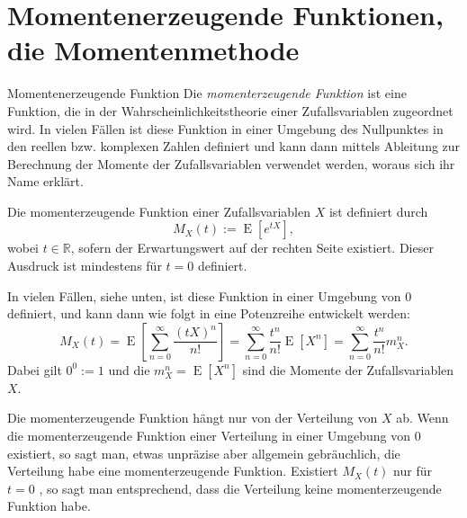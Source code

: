 \section{Momentenerzeugende Funktionen, die Momentenmethode}

\begin{defi}{Momentenerzeugende Funktion}
    Die \emph{momenterzeugende Funktion} ist eine Funktion, die in der Wahrscheinlichkeitstheorie einer Zufallsvariablen zugeordnet wird. In vielen Fällen ist diese Funktion in einer Umgebung des Nullpunktes in den reellen bzw. komplexen Zahlen definiert und kann dann mittels Ableitung zur Berechnung der Momente der Zufallsvariablen verwendet werden, woraus sich ihr Name erklärt.

    Die momenterzeugende Funktion einer Zufallsvariablen $X$ ist definiert durch
    \[
        M_X(t) := \operatorname{E} \left[ e^{tX} \right],
    \]
    wobei $t \in \mathbb{R}$, sofern der Erwartungswert auf der rechten Seite existiert.
    Dieser Ausdruck ist mindestens für $t = 0$ definiert.

    In vielen Fällen, siehe unten, ist diese Funktion in einer Umgebung von $0$ definiert, und kann dann wie folgt in eine Potenzreihe entwickelt werden:
    \[
        M_X(t) = \operatorname{E} \left[ \sum_{n=0}^{\infty} \frac{(tX)^n}{n!} \right] = \sum_{n=0}^{\infty} \frac{t^n}{n!} \operatorname{E} [X^n] = \sum_{n=0}^{\infty} \frac{t^n}{n!} m_X^n.
    \]
    Dabei gilt $0^0 := 1$ und die $m_X^n = \operatorname{E} [X^n]$ sind die Momente der Zufallsvariablen $X$.

    Die momenterzeugende Funktion hängt nur von der Verteilung von $X$ ab.
    Wenn die momenterzeugende Funktion einer Verteilung in einer Umgebung von $0$ existiert, so sagt man, etwas unpräzise aber allgemein gebräuchlich, die Verteilung habe eine momenterzeugende Funktion.
    Existiert $M_{X}(t)$ nur für $t = 0$ , so sagt man entsprechend, dass die Verteilung keine momenterzeugende Funktion habe.
\end{defi}

